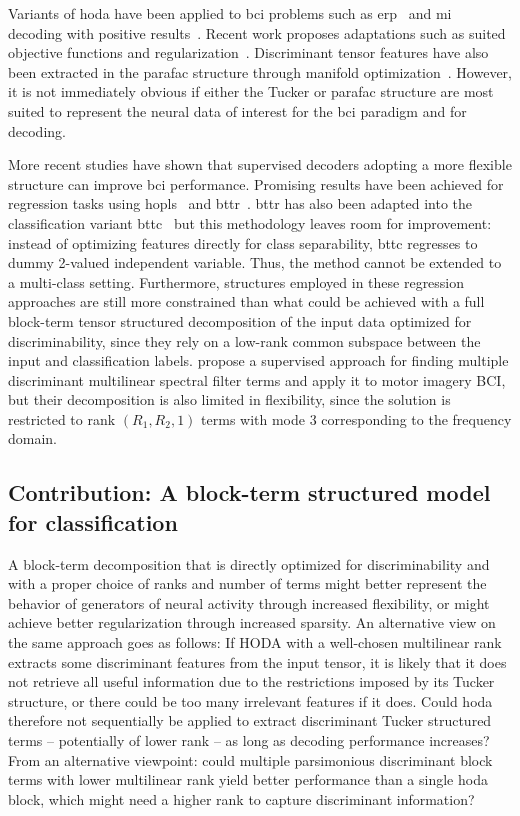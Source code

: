 \documentclass[twocolumn]{article}
\begin{document}
Variants of \ac{hoda} have been applied to \ac{bci} problems such as
\ac{erp}~\cite{Onishi2012,Higashi2016} and \ac{mi}~\cite{Liu2015,Cai2021}
decoding with positive results~\cite{Lotte2018}.
Recent work proposes adaptations such as suited objective
functions and regularization~\cite{JamshidiIdaji2017,Jorajuria2022,Aghili2023}.
Discriminant tensor features have also been extracted
in the \ac{parafac} structure through manifold optimization~\cite{Froelich2018}.
However, it is not immediately obvious if either the Tucker or \ac{parafac}
structure are most suited to represent the neural data of interest for the
\ac{bci}
paradigm and for decoding.

More recent studies have shown that supervised decoders adopting a more flexible structure
can improve \ac{bci} performance.
Promising results have been achieved for regression tasks using
\ac{hopls}~\cite{Zhao2012,Camarrone2018} and \ac{bttr}~\cite{Faes2022,Faes2022a}.
\ac{bttr} has also been adapted into the classification variant \ac{bttc}~\cite{Camarrone2021}
but this methodology leaves room for improvement:
instead of optimizing features directly for class separability, \ac{bttc} regresses
to dummy 2-valued independent variable.
Thus, the method cannot be extended to a multi-class setting.
Furthermore, structures employed in these regression approaches are still more constrained
than what could be achieved with a full block-term tensor structured decomposition of the input data optimized for discriminability, since they rely on a low-rank common subspace
between the input and classification labels.
\textcite{Huang2020} propose a supervised approach for finding multiple discriminant
multilinear spectral filter terms and apply it to motor imagery BCI, but their
decomposition is also limited in flexibility, since the solution is
restricted to rank $(R_1,R_2,1)$ terms with mode 3 corresponding to the frequency domain.

\subsection{Contribution: A block-term structured model for classification}

A block-term decomposition that is directly optimized for discriminability and with a
proper choice of ranks and number of terms might better represent the behavior
of generators of neural activity through increased flexibility, or might
achieve better regularization through increased sparsity.
An alternative view on the same approach goes as follows:
If HODA with a well-chosen multilinear rank extracts some discriminant features
from the input tensor, it is likely that it does not retrieve all useful
information due to the restrictions imposed by its Tucker structure, or there
could be too many irrelevant features if it does.
Could \ac{hoda} therefore not sequentially be applied to extract discriminant
Tucker structured terms -- potentially of lower rank -- as long as decoding
performance increases?
From an alternative viewpoint: could multiple parsimonious discriminant block terms with lower
multilinear rank yield better performance than a single \ac{hoda} block, which
might need a higher rank to capture discriminant information?
\end{document}
